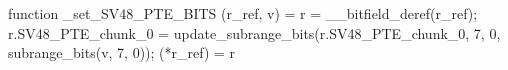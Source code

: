 function _set_SV48_PTE_BITS (r_ref, v) = {
    r = __bitfield_deref(r_ref);
    r.SV48_PTE_chunk_0 = update_subrange_bits(r.SV48_PTE_chunk_0, 7, 0, subrange_bits(v, 7, 0));
    (*r_ref) = r
}
